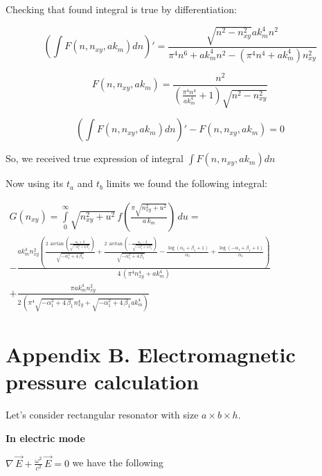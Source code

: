 \documentclass[11pt]{article}
\begin{document}
    Checking that found integral is true by differentiation:

    \[\left( \int F\left(n, n_{xy}, ak_m\right) dn \right)' = \frac{\sqrt{n^{2} - n_{\mathit{xy}}^{2}} \mathit{ak}_{m}^{4} n^{2}}{\pi^{4} n^{6} + \mathit{ak}_{m}^{4} n^{2} - {\left(\pi^{4} n^{4} + \mathit{ak}_{m}^{4}\right)} n_{\mathit{xy}}^{2}}\]

\[F\left(n, n_{xy}, ak_m\right)= \frac{n^{2}}{{\left(\frac{\pi^{4} n^{4}}{\mathit{ak}_{m}^{4}} + 1\right)} \sqrt{n^{2} - n_{\mathit{xy}}^{2}}}\]

\[\left( \int F\left(n, n_{xy}, ak_m\right) dn \right)'-F\left(n, n_{xy}, ak_m\right) = 0\]

    So, we received true expression of integral
\(\int F\left(n, n_{xy}, ak_m\right) dn\)

Now using its \(t_a\) and \(t_b\) limits we found the following
integral:

    \(\begin{array}{r}  G\left(n_{xy}\right) = \int\limits_{0}^{\infty}\sqrt{n_{xy}^2+u^2}\, f\left(\frac{\pi\sqrt{n_{xy}^2+u^2}}{a\,k_m}\right)\,d{u} = \\  -\frac{\mathit{ak}_{m}^{4} n_{\mathit{xy}}^{2} {\left(\frac{2 \, \arctan\left(\frac{\alpha_{1} + 2}{\sqrt{-\alpha_{1}^{2} + 4 \, \beta_{1}}}\right)}{\sqrt{-\alpha_{1}^{2} + 4 \, \beta_{1}}} + \frac{2 \, \arctan\left(-\frac{\alpha_{1} - 2}{\sqrt{-\alpha_{1}^{2} + 4 \, \beta_{1}}}\right)}{\sqrt{-\alpha_{1}^{2} + 4 \, \beta_{1}}} - \frac{\log\left(\alpha_{1} + \beta_{1} + 1\right)}{\alpha_{1}} + \frac{\log\left(-\alpha_{1} + \beta_{1} + 1\right)}{\alpha_{1}}\right)}}{4 \, {\left(\pi^{4} n_{\mathit{xy}}^{4} + \mathit{ak}_{m}^{4}\right)}} \\ +\frac{\pi \mathit{ak}_{m}^{4} n_{\mathit{xy}}^{2}}{2 \, {\left(\pi^{4} \sqrt{-\alpha_{1}^{2} + 4 \, \beta_{1}} n_{\mathit{xy}}^{4} + \sqrt{-\alpha_{1}^{2} + 4 \, \beta_{1}} \mathit{ak}_{m}^{4}\right)}} \end{array}\)

    \section{Appendix B. Electromagnetic pressure
calculation}\label{appendix-b.-electromagnetic-pressure-calculation}

    Let's consider rectangular resonator with size \(a \times b \times h\).

    \textbf{In electric mode}

\(\nabla\,\vec{E} + \frac{\omega^2}{c^2}\,\vec{E} = 0\) we have the
following
\end{document}
